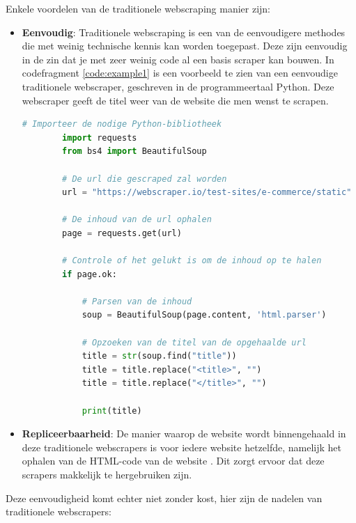 Enkele voordelen van de traditionele webscraping manier zijn:
\begin{itemize}
    \item \textbf{Eenvoudig}: Traditionele webscraping is een van de eenvoudigere methodes die met weinig technische kennis kan worden toegepast. Deze zijn eenvoudig in de zin dat je met zeer weinig code al een basis scraper kan bouwen. In codefragment \ref{code:example1} is een voorbeeld te zien van een eenvoudige traditionele webscraper, geschreven in de programmeertaal Python. Deze webscraper geeft de titel weer van de website die men wenst te scrapen.

\begin{listing}
    \begin{lstlisting}[language=python, captionpos=b, caption={Een voorbeeld van een eenvoudige webscraper.}, label={code:example1}]
        # Importeer de nodige Python-bibliotheek
        import requests
        from bs4 import BeautifulSoup

        # De url die gescraped zal worden
        url = "https://webscraper.io/test-sites/e-commerce/static"

        # De inhoud van de url ophalen
        page = requests.get(url)

        # Controle of het gelukt is om de inhoud op te halen
        if page.ok:

            # Parsen van de inhoud
            soup = BeautifulSoup(page.content, 'html.parser')

            # Opzoeken van de titel van de opgehaalde url
            title = str(soup.find("title"))
            title = title.replace("<title>", "")
            title = title.replace("</title>", "")

            print(title)
    \end{lstlisting}
\end{listing}

    \item \textbf{Repliceerbaarheid}: De manier waarop de website wordt binnengehaald in deze traditionele webscrapers is voor iedere website hetzelfde, namelijk het ophalen van de HTML-code van de website . Dit zorgt ervoor dat deze scrapers makkelijk te hergebruiken zijn.
\end{itemize}

Deze eenvoudigheid komt echter niet zonder kost, hier zijn de nadelen van traditionele webscrapers:

